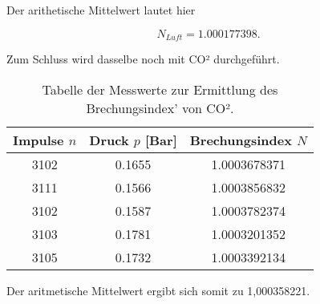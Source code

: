 Der arithetische Mittelwert lautet hier

\begin{equation}
  N_{Luft} = 1.000177398.
\end{equation}

Zum Schluss wird dasselbe noch mit CO² durchgeführt.

\begin{table}
  \centering
  \caption{Tabelle der Messwerte zur Ermittlung des Brechungsindex' von CO².}
  \label{tab:tab2}
  \begin{tabular}{c | c | c}
    \toprule
    Impulse \(n\) & Druck \(p\) [Bar] & Brechungsindex \(N\)\\
    \midrule
    3102 & 0.1655 & 1.0003678371\\
    3111 & 0.1566 & 1.0003856832\\
    3102 & 0.1587 & 1.0003782374\\
    3103 & 0.1781 & 1.0003201352\\
    3105 & 0.1732 & 1.0003392134\\
    \bottomrule
  \end{tabular}
\end{table}

Der aritmetische Mittelwert ergibt sich somit zu 1,000358221.